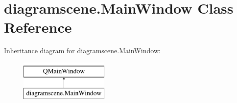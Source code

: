 \hypertarget{classdiagramscene_1_1MainWindow}{}\section{diagramscene.\+Main\+Window Class Reference}
\label{classdiagramscene_1_1MainWindow}
Inheritance diagram for diagramscene.\+Main\+Window\+:\begin{figure}[H]
\begin{center}
\leavevmode
\includegraphics[height=2.000000cm]{classdiagramscene_1_1MainWindow}
\end{center}
\end{figure}
